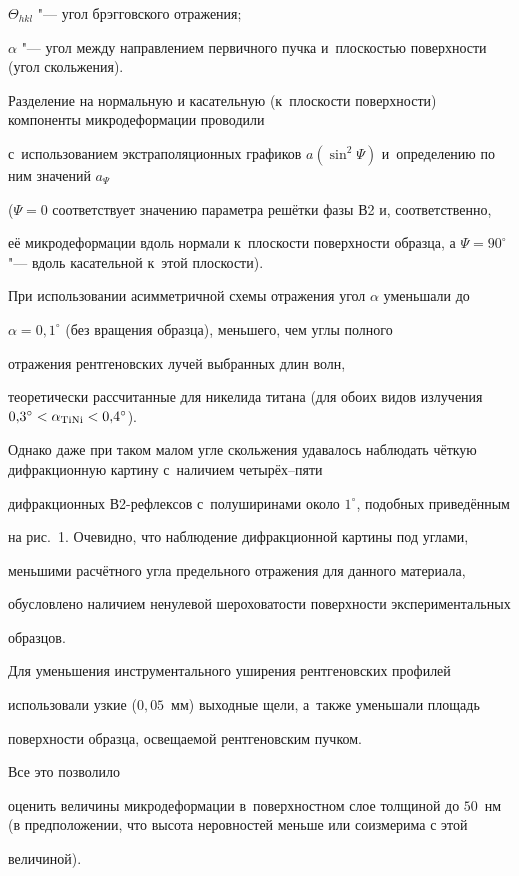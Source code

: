 $\Theta_{hkl}$ "--- угол брэгговского отражения;

$\alpha$ "--- угол между направлением первичного пучка и~плоскостью поверхности (угол скольжения).

Разделение на нормальную и касательную (к~плоскости поверхности) компоненты микродеформации проводили

с~использованием экстраполяционных графиков $a(\sin^2\Psi)$ и~определению по ним значений $a_\Psi$

($\Psi=0$  соответствует значению параметра решётки фазы В2 и, соответственно,

её микродеформации вдоль нормали к~плоскости поверхности образца, а $\Psi=90^\circ$ "--- вдоль касательной к~этой плоскости).



При использовании асимметричной схемы отражения угол $\alpha $ уменьшали до

$\alpha =0{,}1^\circ$ (без вращения образца), меньшего, чем углы полного

отражения рентгеновских лучей выбранных длин волн,

теоретически рассчитанные для никелида титана (для обоих видов излучения $0{,}3^\circ<\alpha_{\rm TiNi}<0{,}4^\circ$).

Однако даже при таком малом угле скольжения удавалось наблюдать чёткую дифракционную картину с~наличием четырёх--пяти

дифракционных В2-рефлексов с~полуширинами около $1^\circ$, подобных приведённым

на рис.~1. Очевидно, что наблюдение дифракционной картины под углами,

меньшими расчётного угла предельного отражения для данного материала,

обусловлено наличием ненулевой шероховатости поверхности экспериментальных

образцов.

Для уменьшения инструментального уширения рентгеновских профилей

использовали узкие ($0{,}05$~мм) выходные щели, а~также уменьшали площадь

поверхности образца, освещаемой рентгеновским пучком.

Все это позволило

оценить величины микродеформации в~поверхностном слое толщиной до $50$~нм (в предположении, что высота неровностей меньше или соизмерима с этой

величиной).



